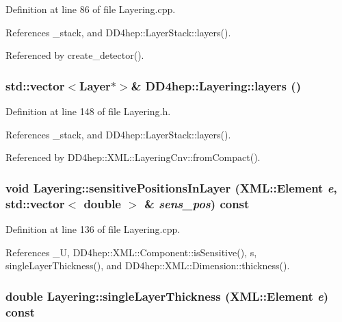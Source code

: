Definition at line 86 of file Layering.cpp.

References \_\-stack, and DD4hep::LayerStack::layers().

Referenced by create\_\-detector().\hypertarget{class_d_d4hep_1_1_layering_ab6b0103b1e2d3f16f3a423e9cf73c32b}{
\subsubsection[{layers}]{\setlength{\rightskip}{0pt plus 5cm}std::vector$<${\bf Layer}$\ast$$>$\& DD4hep::Layering::layers ()}}
\label{class_d_d4hep_1_1_layering_ab6b0103b1e2d3f16f3a423e9cf73c32b}


Definition at line 148 of file Layering.h.

References \_\-stack, and DD4hep::LayerStack::layers().

Referenced by DD4hep::XML::LayeringCnv::fromCompact().\hypertarget{class_d_d4hep_1_1_layering_a56a4015dcdc9ca84881ad84610744451}{
\subsubsection[{sensitivePositionsInLayer}]{\setlength{\rightskip}{0pt plus 5cm}void Layering::sensitivePositionsInLayer ({\bf XML::Element} {\em e}, \/  std::vector$<$ double $>$ \& {\em sens\_\-pos}) const}}
\label{class_d_d4hep_1_1_layering_a56a4015dcdc9ca84881ad84610744451}


Definition at line 136 of file Layering.cpp.

References \_\-U, DD4hep::XML::Component::isSensitive(), s, singleLayerThickness(), and DD4hep::XML::Dimension::thickness().\hypertarget{class_d_d4hep_1_1_layering_a74a4fb01a9bea82276a74462d345e8a3}{
\subsubsection[{singleLayerThickness}]{\setlength{\rightskip}{0pt plus 5cm}double Layering::singleLayerThickness ({\bf XML::Element} {\em e}) const}}
\label{class_d_d4hep_1_1_layering_a74a4fb01a9bea82276a74462d345e8a3}


